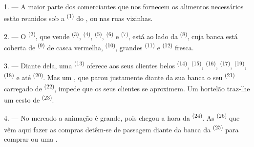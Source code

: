%

\VUsaut{4.0mm}
\VUsaut{3.0mm}

\VUsaut{3.0mm}

1. --- A maior parte dos comerciantes que nos fornecem os alimentos
necessários estão reunidos sob a  \textsuperscript{(1)} do
, ou nas ruas vizinhas.

2. --- O  \textsuperscript{(2)}, que vende 
\textsuperscript{(3)},  \textsuperscript{(4)}, 
\textsuperscript{(5)},  \textsuperscript{(6)} e 
\textsuperscript{(7)}, está ao lado da 
\textsuperscript{(8)}, cuja banca está coberta de 
\textsuperscript{(9)} de casca vermelha,  \textsuperscript{(10)},
grandes  \textsuperscript{(11)} e  \textsuperscript{(12)} fresca.

3. --- Diante dela, uma  \textsuperscript{(13)} oferece aos
seus clientes belos  \textsuperscript{(14)}, 
\textsuperscript{(15)},  \textsuperscript{(16)}, 
\textsuperscript{(17)},  \textsuperscript{(19)}, 
\textsuperscript{(18)} e até  \textsuperscript{(20)}. Mas um
, que parou justamente diante da sua banca o seu
 \textsuperscript{(21)} carregado de  \textsuperscript{(22)}, impede que os seus clientes se aproximem. Um
hortelão traz-lhe um cesto de  \textsuperscript{(23)}.

\VUsaut{4.0mm}
\VUsaut{3.0mm}

4. --- No mercado a animação é grande, pois chegou a hora da
 \textsuperscript{(24)}. As 
\textsuperscript{(26)} que vêm aqui fazer as compras detêm-se de passagem diante
da banca da  \textsuperscript{(25)} para comprar
 ou uma .

